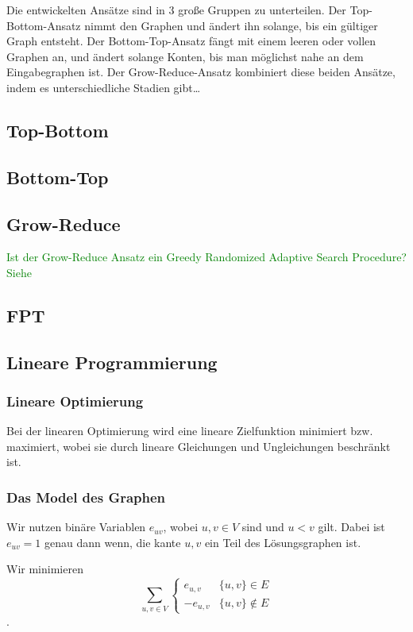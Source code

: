 \documentclass[12pt,a4paper,onecolumn,oneside,titlepage]{article}
\begin{document}
Die entwickelten Ansätze sind in 3 große Gruppen zu unterteilen.
Der Top-Bottom-Ansatz nimmt den Graphen und ändert ihn solange, bis ein gültiger Graph entsteht. Der Bottom-Top-Ansatz fängt mit einem leeren oder vollen Graphen an, und ändert solange Konten, bis man möglichst nahe an dem Eingabegraphen ist.
Der Grow-Reduce-Ansatz kombiniert diese beiden Ansätze, indem es unterschiedliche Stadien gibt… 

\subsection{Top-Bottom}
\subsection{Bottom-Top}
\subsection{Grow-Reduce}
\textcolor{green}{Ist der Grow-Reduce Ansatz ein Greedy Randomized Adaptive Search Procedure? Siehe \cite{Bastos2014}}
\subsection{FPT}
\subsection{Lineare Programmierung}
\subsubsection{Lineare Optimierung}
Bei der linearen Optimierung wird eine lineare Zielfunktion minimiert bzw. maximiert, wobei sie durch lineare Gleichungen und Ungleichungen beschränkt ist.
\subsubsection{Das Model des Graphen}
Wir nutzen binäre Variablen $e_{uv}$, wobei $u,v \in V$ sind und $u < v$ gilt.
Dabei ist $e_{uv} = 1$ genau dann wenn, die kante ${u,v}$ ein Teil des Lösungsgraphen ist.

Wir minimieren \[\sum_{u,v \in V} 
\begin{cases} 
      e_{u,v} & \{u,v\} \in E \\
      -e_{u,v} & \{u,v\} \notin E
   \end{cases}\].
   
\end{document}
